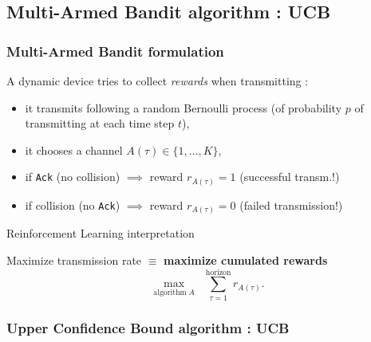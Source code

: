 \subsection{Multi-Armed Bandit algorithm : UCB}

\subsubsection{Multi-Armed Bandit formulation}

\begin{frameO}

    A dynamic device tries to collect \emph{rewards} when transmitting :

    \begin{itemize}
        \item
            it transmits following a random Bernoulli process \newline
            (of probability \(p\) of transmitting at each time step \(t\)),
        \item
            it chooses a channel \(A(\tau) \in \{1,\dots,K\}\),
        \item
            if \texttt{Ack} (no collision) \hspace*{2pt} \(\implies\) reward
            \(r_{A(\tau)} = 1\) \hfill{} (successful transm.!)
        \item
            if collision (no \texttt{Ack}) \hspace*{2pt} \(\implies\) reward
            \(r_{A(\tau)} = 0\) \hfill{} (failed transmission!)
    \end{itemize}

    \vfill{}

    \begin{colorblock}{Reinforcement Learning interpretation}

        Maximize transmission rate \(\equiv\) \textbf{maximize cumulated rewards}
        \[\max_{\text{algorithm}\;A} \;\; \sum_{\tau=1}^{\text{horizon}} r_{A(\tau)}.\]

    \end{colorblock}

\end{frameO}

\subsubsection{Upper Confidence Bound algorithm : UCB}

